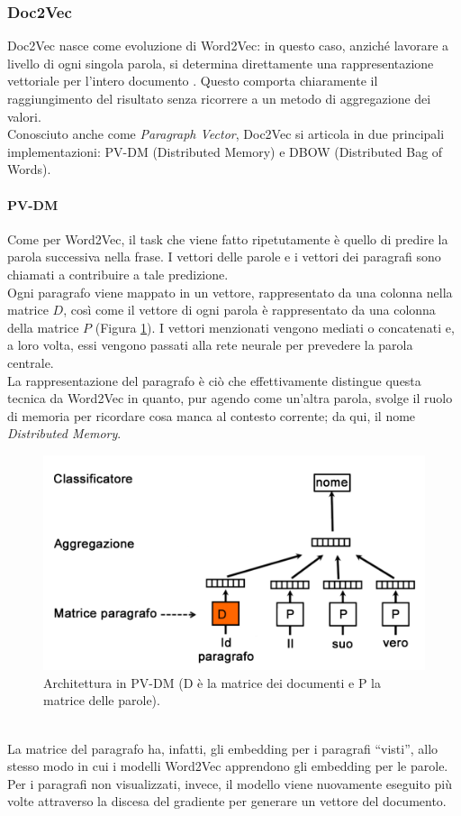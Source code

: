 \documentclass[12pt]{report}
\theoremstyle{definition}
\begin{document}
\subsubsection{Doc2Vec} \label{d2v}
Doc2Vec nasce come evoluzione di Word2Vec: in questo caso, anziché lavorare a livello di ogni singola parola, si determina direttamente una rappresentazione vettoriale per l'intero documento \cite{24}.
Questo comporta chiaramente il raggiungimento del risultato senza ricorrere a un metodo di aggregazione dei valori.
\\
Conosciuto anche come \textit{Paragraph Vector}, Doc2Vec si articola in due principali implementazioni: PV-DM (Distributed Memory) e DBOW (Distributed Bag of Words).

\paragraph{PV-DM} 
Come per Word2Vec, il task che viene fatto ripetutamente è quello di predire la parola successiva nella frase. I vettori delle parole e i vettori dei paragrafi sono chiamati a contribuire a tale predizione.
\\
Ogni paragrafo viene mappato in un vettore, rappresentato da una colonna nella matrice $D$, così come il vettore di ogni parola è rappresentato da una colonna della matrice $P$ (Figura \ref{pvdm}). I vettori menzionati vengono mediati o concatenati e, a loro volta, essi vengono passati alla rete neurale per prevedere la parola centrale.
\\
La rappresentazione del paragrafo è ciò che effettivamente distingue questa tecnica da Word2Vec in quanto, pur agendo come un'altra parola, svolge il ruolo di memoria per ricordare cosa manca al contesto corrente; da qui, il nome \textit{Distributed Memory}.
\\
\begin{figure}
    \centering
    \includegraphics[scale = 0.3]{images/pvdm.png}
    \caption{Architettura in PV-DM (D è la matrice dei documenti e P la matrice delle parole).}
    \label{pvdm}
\end{figure}
\\
La matrice del paragrafo ha, infatti, gli embedding per i paragrafi ``visti'', allo stesso modo in cui i modelli Word2Vec apprendono gli embedding per le parole. Per i paragrafi non visualizzati, invece, il modello viene nuovamente eseguito più volte attraverso la discesa del gradiente per generare un vettore del documento. 
\end{document}
